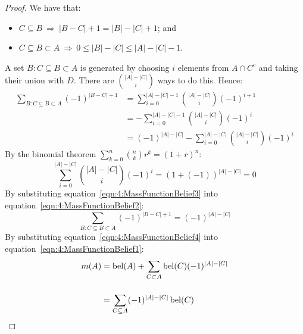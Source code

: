 \begin{thm}
\begin{proof}
    We have that:
    \begin{itemize}
      \item $C \subseteq B \ \Rightarrow\  |B - C| + 1 = |B| - |C| + 1$; and
      \item $C \subseteq B \subset A \ \Rightarrow\  0 \leq |B| - |C| \leq |A| - |C| - 1$.
    \end{itemize}
    A set $B : C \subseteq B \subset A$ is generated by choosing $i$ elements from
    $A \cap C^c$ and taking their union with $D$.
    There are $\binom{|A| - |C|}{i}$ ways to do this.
    Hence:
    \begin{align}
      \label{eqn:4:MassFunctionBelief2}
      \sum_{B : C \subseteq B \subset A} (-1)^{|B - C| + 1}
       & = \sum_{i = 0}^{|A| - |C| - 1} \binom{|A| - |C|}{i} (-1)^{i + 1} \nonumber
      \\[3ex]
       & = - \sum_{i = 0}^{|A| - |C| - 1} \binom{|A| - |C|}{i} (-1)^{i} \nonumber
      \\[3ex]
       & = (- 1)^{|A| - |C|} - \sum_{i = 0}^{|A| - |C|} \binom{|A| - |C|}{i} (-1)^{i}
    \end{align}
    By the binomial theorem $\sum_{k = 0}^{n} \binom{n}{k} r^{k} = (1 + r)^{n}$:
    \begin{equation}
      \label{eqn:4:MassFunctionBelief3}
      \sum_{i = 0}^{|A| - |C|} \binom{|A| - |C|}{i} (-1)^{i}
      = (1 + (- 1))^{|A| - |C|}
      = 0
    \end{equation}
    By substituting equation~\ref{eqn:4:MassFunctionBelief3} into
    equation~\ref{eqn:4:MassFunctionBelief2}:
    \begin{equation}
      \label{eqn:4:MassFunctionBelief4}
      \sum_{B : C \subseteq B \subset A} (-1)^{|B - C| + 1}
      = (- 1)^{|A| - |C|}
    \end{equation}
    By substituting equation~\ref{eqn:4:MassFunctionBelief4} into
    equation~\ref{eqn:4:MassFunctionBelief1}:
    \begin{align*}
      m(A)
       & = \operatorname*{bel}(A) + \sum_{C \subset A} \operatorname*{bel}(C) (- 1)^{|A| - |C|}
      \\[3ex]
       & = \sum_{C \subseteq A}  (- 1)^{|A| - |C|} \operatorname*{bel}(C)
    \end{align*}
  \end{proof}
\end{thm}
